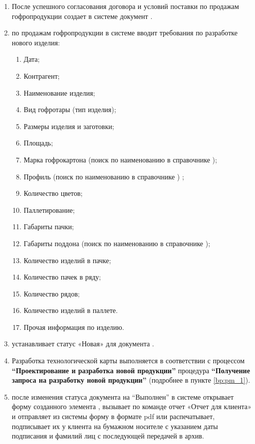 \begin{enumerate}
\item	После успешного согласования договора и условий поставки \manager по продажам гофропродукции создает в системе \gofro документ .



\item \manager по продажам гофропродукции в системе \gofro вводит требования по разработке нового изделия:

\begin{enumerate}
\item 	Дата;
\item 	Контрагент;
\item 	Наименование изделия;
\item 	Вид гофротары (тип изделия);
\item 	Размеры изделия и  заготовки;
\item 	Площадь;
\item 	Марка гофрокартона (поиск по наименованию в справочнике );
\item 	Профиль (поиск по наименованию в справочнике ) ;
\item 	Количество цветов;
\item 	Паллетирование;
\item 	Габариты пачки;
\item 	Габариты поддона (поиск по наименованию в справочнике );
\item 	Количество изделий в пачке;
\item 	Количество пачек в ряду;
\item 	Количество рядов;
\item 	Количество изделий в паллете.
\item 	Прочая информация по изделию.
\end{enumerate}
\item \manager устанавливает статус «Новая» для документа .
\item 	Разработка технологической карты выполняется в соответствии с процессом \textbf{“Проектирование и разработка новой продукции”} процедура \textbf{“Получение запроса на разработку новой продукции”} (подробнее в пункте \ref{bp:pm_1}).
\item \manager	после изменения \tehnolog статуса  документа  на “Выполнен” в системе \gofro открывает форму созданного элемента , вызывает по команде  отчет «Отчет для клиента» и отправляет из системы \gofro форму в формате pdf или распечатывает, подписывает их у клиента на бумажном носителе с указанием даты подписания и фамилий лиц с последующей передачей в архив.

\end{enumerate}
